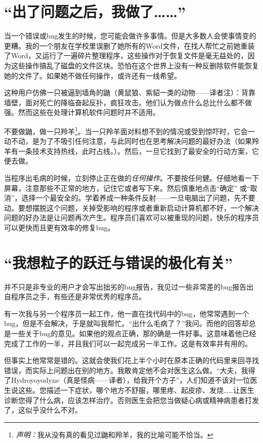 \documentclass[titlepage]{article}
\begin{document}
\section{{“出了问题之后，我做了……”}}

当一个错误或bug发生的时候，您可能会做许多事情。但是大多数人会使事情变的更糟。我的一个朋友在学校里误删了她所有的Word文件，在找人帮忙之前她重装了Word，又运行了一遍碎片整理程序，这些操作对于恢复文件是毫无益处的，因为这些操作搞乱了磁盘的文件区块。恐怕在这个世界上没有一种反删除软件能恢复她的文件了。如果她不做任何操作，或许还有一线希望。

这种用户仿佛一只被逼到墙角的鼬（黄鼠狼、紫貂一类的动物——译者注）：背靠墙壁，面对死亡的降临奋起反扑，疯狂攻击。他们认为做点什么总比什么都不做强。然而这些在处理计算机软件问题时并不适用。

不要做鼬，做一只羚羊\footnote{\emph{声明：}我从没有真的看见过鼬和羚羊，我的比喻可能不恰当。}。当一只羚羊面对料想不到的情况或受到惊吓时，它会一动不动，是为了不吸引任何注意，与此同时也在思考解决问题的最好办法（如果羚羊有一条技术支持热线，此时占线。）。然后，一旦它找到了最安全的行动方案，它便去做。

当程序出毛病的时候，立刻停止正在做的\emph{任何操作}。不要按任何健。仔细地看一下屏幕，注意那些不正常的地方，记住它或者写下来。然后慎重地点击“确定” 或“取消”，选择一个最安全的。学着养成一种条件反射——一旦电脑出了问题，先不要动。要想摆脱这个问题，关掉受影响的程序或者重新启动计算机都不好，一个解决问题的好办法是让问题再次产生。程序员们喜欢可以被重现的问题，快乐的程序员可以更快而且更有效率的修复bug。

\section{{“我想粒子的跃迁与错误的极化有关”}}

并不只是非专业的用户才会写出拙劣的bug报告，我见过一些非常差的bug报告出自程序员之手，有些还是非常优秀的程序员。

有一次我与另一个程序员一起工作，他一直在找代码中的bug，他常常遇到一个bug，但是不会解决，于是就叫我帮忙。“出什么毛病了？”我问。而他的回答却总是一些关于bug的意见。如果他的观点正确，那的确是一件好事。这意味着他已经完成了工作的一半，并且我们可以一起完成另一半工作。这是有效率并有用的。

但事实上他常常是错的。这就会使我们花上半个小时在原本正确的代码里来回寻找错误，而实际上问题出在别的地方。我敢肯定他不会对医生这么做。“大夫，我得了Hydroyoyodyne（真是怪病——译者），给我开个方子”，人们知道不该对一位医生说这些。您描述一下症状，哪个地方不舒服，哪里疼、起皮疹、发烧……让医生诊断您得了什么病，应该怎样治疗。否则医生会把您当做疑心病或精神病患者打发了，这似乎没什么不对。
\end{document}
